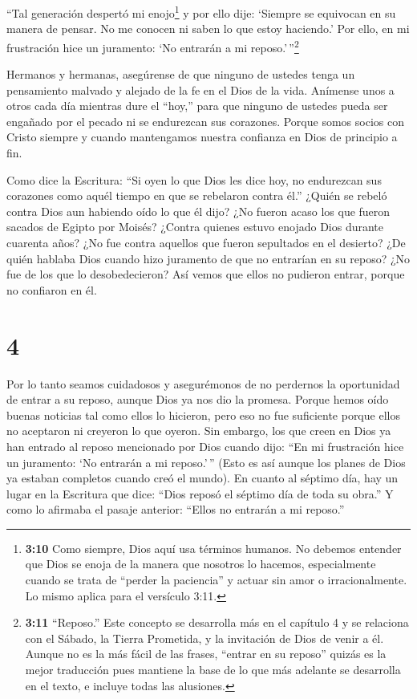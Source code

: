  ``Tal generación despertó mi enojo\footnote{\textbf{3:10}
  Como siempre, Dios aquí usa términos humanos. No debemos entender que
  Dios se enoja de la manera que nosotros lo hacemos, especialmente
  cuando se trata de ``perder la paciencia'' y actuar sin amor o
  irracionalmente. Lo mismo aplica para el versículo 3:11.} y por ello
dije: `Siempre se equivocan en su manera de pensar. No me conocen ni
saben lo que estoy haciendo.'  Por ello, en mi frustración
hice un juramento: `No entrarán a mi reposo.'\,''\footnote{\textbf{3:11}
  ``Reposo.'' Este concepto se desarrolla más en el capítulo 4 y se
  relaciona con el Sábado, la Tierra Prometida, y la invitación de Dios
  de venir a él. Aunque no es la más fácil de las frases, ``entrar en su
  reposo'' quizás es la mejor traducción pues mantiene la base de lo que
  más adelante se desarrolla en el texto, e incluye todas las alusiones.}

 Hermanos y hermanas, asegúrense de que ninguno de ustedes
tenga un pensamiento malvado y alejado de la fe en el Dios de la vida.
 Anímense unos a otros cada día mientras dure el ``hoy,''
para que ninguno de ustedes pueda ser engañado por el pecado ni se
endurezcan sus corazones.  Porque somos socios con Cristo
siempre y cuando mantengamos nuestra confianza en Dios de principio a
fin.

 Como dice la Escritura: ``Si oyen lo que Dios les dice
hoy, no endurezcan sus corazones como aquél tiempo en que se rebelaron
contra él.''  ¿Quién se rebeló contra Dios aun habiendo
oído lo que él dijo? ¿No fueron acaso los que fueron sacados de Egipto
por Moisés?  ¿Contra quienes estuvo enojado Dios durante
cuarenta años? ¿No fue contra aquellos que fueron sepultados en el
desierto?  ¿De quién hablaba Dios cuando hizo juramento de
que no entrarían en su reposo? ¿No fue de los que lo desobedecieron?
 Así vemos que ellos no pudieron entrar, porque no
confiaron en él.

\hypertarget{section-3}{%
\section{4}\label{section-3}}

 Por lo tanto seamos cuidadosos y asegurémonos de no
perdernos la oportunidad de entrar a su reposo, aunque Dios ya nos dio
la promesa.  Porque hemos oído buenas noticias tal como
ellos lo hicieron, pero eso no fue suficiente porque ellos no aceptaron
ni creyeron lo que oyeron.  Sin embargo, los que creen en
Dios ya han entrado al reposo mencionado por Dios cuando dijo: ``En mi
frustración hice un juramento: `No entrarán a mi reposo.'\,'' (Esto es
así aunque los planes de Dios ya estaban completos cuando creó el
mundo).  En cuanto al séptimo día, hay un lugar en la
Escritura que dice: ``Dios reposó el séptimo día de toda su obra.''
 Y como lo afirmaba el pasaje anterior: ``Ellos no entrarán
a mi reposo.''

